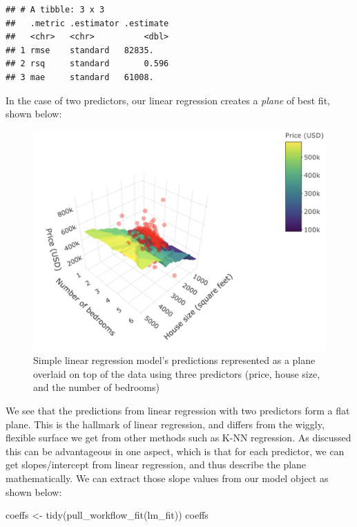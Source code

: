 \documentclass[
]{krantz}
\makeatletter
\newenvironment{Shaded}{\begin{snugshade}}{\end{snugshade}}
\newcommand{\FunctionTok}[1]{\textcolor[rgb]{0,0,0}{#1}}
\newcommand{\NormalTok}[1]{#1}
\newcommand{\OtherTok}[1]{\textcolor[rgb]{0.37,0.37,0.37}{#1}}
\newenvironment{kframe}{%
\medskip{}
\setlength{\fboxsep}{.8em}
 \def\at@end@of@kframe{}%
 \ifinner\ifhmode%
  \def\at@end@of@kframe{\end{minipage}}%
  \begin{minipage}{\columnwidth}%
 \fi\fi%
 \def\FrameCommand##1{\hskip\@totalleftmargin \hskip-\fboxsep
 \colorbox{shadecolor}{##1}\hskip-\fboxsep
     \hskip-\linewidth \hskip-\@totalleftmargin \hskip\columnwidth}%
 \MakeFramed {\advance\hsize-\width
   \@totalleftmargin\z@ \linewidth\hsize
   \@setminipage}}%
 {\par\unskip\endMakeFramed%
 \at@end@of@kframe}
\renewenvironment{Shaded}{\begin{kframe}}{\end{kframe}}
\makeatother
\begin{document}
\begin{verbatim}
## # A tibble: 3 x 3
##   .metric .estimator .estimate
##   <chr>   <chr>          <dbl>
## 1 rmse    standard   82835.   
## 2 rsq     standard       0.596
## 3 mae     standard   61008.
\end{verbatim}

In the case of two predictors, our linear regression creates a \emph{plane} of best fit, shown below:

\begin{figure}
\includegraphics[width=26.81in]{img/knn-regr_3d} \caption{Simple linear regression model’s predictions represented as a plane overlaid on top of the data using three predictors (price, house size, and the number of bedrooms)}\label{fig:08-3DlinReg}
\end{figure}

We see that the predictions from linear regression with two predictors form a
flat plane. This is the hallmark of linear regression, and differs from the
wiggly, flexible surface we get from other methods such as K-NN regression.
As discussed this can be advantageous in one aspect, which is that for each
predictor, we can get slopes/intercept from linear regression, and thus describe the
plane mathematically. We can extract those slope values from our model object
as shown below:

\begin{Shaded}
\begin{Highlighting}[]
\NormalTok{coeffs }\OtherTok{\textless{}{-}} \FunctionTok{tidy}\NormalTok{(}\FunctionTok{pull\_workflow\_fit}\NormalTok{(lm\_fit))}
\NormalTok{coeffs}
\end{Highlighting}
\end{Shaded}
\end{document}

